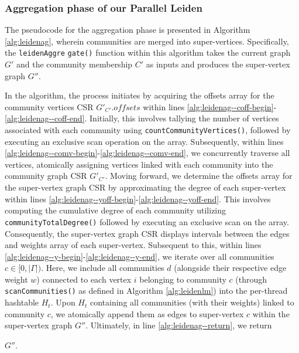 \subsubsection{Aggregation phase of our Parallel Leiden}

The pseudocode for the aggregation phase is presented in Algorithm \ref{alg:leidenag}, wherein communities are merged into super-vertices. Specifically, the \texttt{leidenAggre} \texttt{gate()} function within this algorithm takes the current graph $G'$ and the community membership $C'$ as inputs and produces the super-vertex graph $G''$.



In the algorithm, the process initiates by acquiring the offsets array for the community vertices CSR $G'_{C'}.offsets$ within lines \ref{alg:leidenag--coff-begin}-\ref{alg:leidenag--coff-end}. Initially, this involves tallying the number of vertices associated with each community using \texttt{countCommunityVertices()}, followed by executing an exclusive scan operation on the array. Subsequently, within lines \ref{alg:leidenag--comv-begin}-\ref{alg:leidenag--comv-end}, we concurrently traverse all vertices, atomically assigning vertices linked with each community into the community graph CSR $G'_{C'}$. Moving forward, we determine the offsets array for the super-vertex graph CSR by approximating the degree of each super-vertex within lines \ref{alg:leidenag--yoff-begin}-\ref{alg:leidenag--yoff-end}. This involves computing the cumulative degree of each community utilizing \texttt{communityTotalDegree()} followed by executing an exclusive scan on the array. Consequently, the super-vertex graph CSR displays intervals between the edges and weights array of each super-vertex. Subsequent to this, within lines \ref{alg:leidenag--y-begin}-\ref{alg:leidenag--y-end}, we iterate over all communities $c \in [0, |\Gamma|)$. Here, we include all communities $d$ (alongside their respective edge weight $w$) connected to each vertex $i$ belonging to community $c$ (through \texttt{scanCommunities()} as defined in Algorithm \ref{alg:leidenlm}) into the per-thread hashtable $H_t$. Upon $H_t$ containing all communities (with their weights) linked to community $c$, we atomically append them as edges to super-vertex $c$ within the super-vertex graph $G''$. Ultimately, in line \ref{alg:leidenag--return}, we return $G''$.









